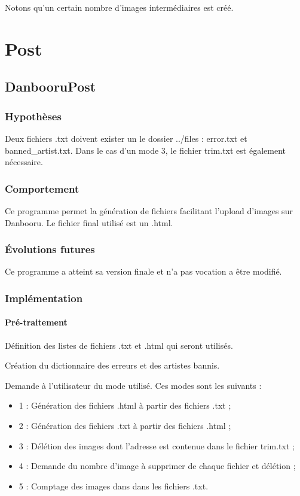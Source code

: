 \documentclass[a4paper,12pt]{article}
\begin{document}
Notons qu'un certain nombre d'images intermédiaires est créé. 
\section{Post}
\subsection{DanbooruPost}
\subsubsection{Hypothèses}
Deux fichiers .txt doivent exister un le dossier \og ../files \fg{} : error.txt et banned\_artist.txt.  Dans le cas d'un mode 3, le fichier trim.txt est également nécessaire.
\subsubsection{Comportement}
Ce programme permet la génération de fichiers facilitant l'upload d'images sur Danbooru. Le fichier final utilisé est un .html.
\subsubsection{Évolutions futures}
Ce programme a atteint sa version finale et n'a pas vocation a être modifié.
\subsubsection{Implémentation}
\paragraph{Pré-traitement}
Définition des listes de fichiers .txt et .html qui seront utilisés.

Création du dictionnaire des erreurs et des artistes bannis.

Demande à l'utilisateur du mode utilisé. Ces modes sont les suivants :
\begin{itemize}
\item 1 : Génération des fichiers .html à partir des fichiers .txt ;
\item 2 : Génération des fichiers .txt à partir des fichiers .html ;
\item 3 : Délétion des images dont l'adresse est contenue dans le fichier trim.txt ;
\item 4 : Demande du nombre d'image à supprimer de chaque fichier et délétion ;
\item 5 : Comptage des images dans dans les fichiers .txt.
\end{itemize}
\end{document}
